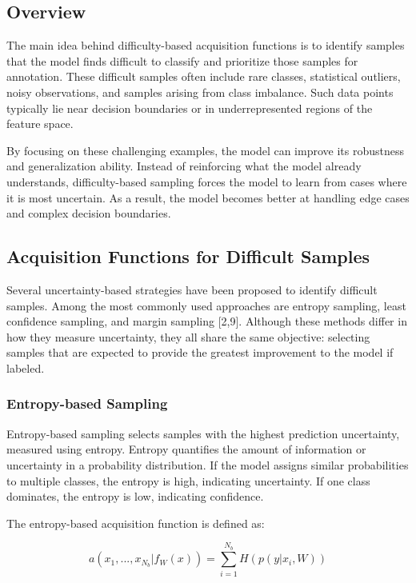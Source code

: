 \documentclass{article}
\renewcommand{\cite}[1]{[#1]}
\begin{document}
\subsection{Overview}

The main idea behind difficulty-based acquisition functions is to identify samples that the model finds difficult to classify and prioritize those samples for annotation. These difficult samples often include rare classes, statistical outliers, noisy observations, and samples arising from class imbalance. Such data points typically lie near decision boundaries or in underrepresented regions of the feature space.

By focusing on these challenging examples, the model can improve its robustness and generalization ability. Instead of reinforcing what the model already understands, difficulty-based sampling forces the model to learn from cases where it is most uncertain. As a result, the model becomes better at handling edge cases and complex decision boundaries.

\subsection{Acquisition Functions for Difficult Samples}

Several uncertainty-based strategies have been proposed to identify difficult samples. Among the most commonly used approaches are entropy sampling, least confidence sampling, and margin sampling \cite{2,9}. Although these methods differ in how they measure uncertainty, they all share the same objective: selecting samples that are expected to provide the greatest improvement to the model if labeled.

\subsubsection{Entropy-based Sampling}

Entropy-based sampling selects samples with the highest prediction uncertainty, measured using entropy. Entropy quantifies the amount of information or uncertainty in a probability distribution. If the model assigns similar probabilities to multiple classes, the entropy is high, indicating uncertainty. If one class dominates, the entropy is low, indicating confidence.

The entropy-based acquisition function is defined as:

\begin{equation}
a(x_1, ..., x_{N_b} | f_W(x)) = \sum_{i=1}^{N_b} H(p(y|x_i, W))
\end{equation}
\end{document}
